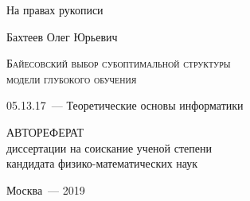 \documentclass[11pt, a5paper]{dissert}
\theoremstyle{definition}
\begin{document}



\begin{titlepage}
\begin{flushright}
{На правах рукописи}
\end{flushright}
\vspace{1.5cm}
\begin{center}
{Бахтеев Олег Юрьевич}
\par
\vspace{2cm}
\textsc{Байесовский выбор субоптимальной структуры
\\модели глубокого обучения }
\par
\vspace{2cm}
{05.13.17~--- Теоретические основы информатики}
\par
\vspace{2cm}
{АВТОРЕФЕРАТ\\
диссертации на соискание ученой степени\\
кандидата физико-математических наук}
\end{center}
\par
\vspace{3.5cm}
\begin{center}
{Москва~--- 2019}
\end{center}
\end{titlepage}
\end{document}
